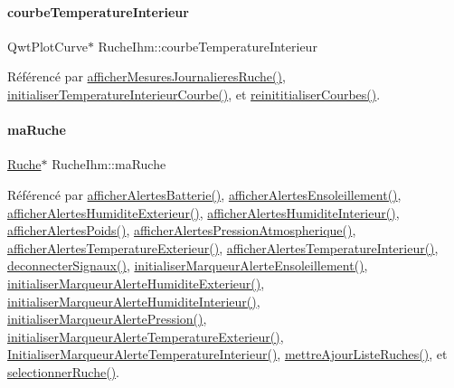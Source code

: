 \paragraph{\texorpdfstring{courbe\+Temperature\+Interieur}{courbeTemperatureInterieur}}
{\footnotesize\ttfamily Qwt\+Plot\+Curve$\ast$ Ruche\+Ihm\+::courbe\+Temperature\+Interieur\hspace{0.3cm}{\ttfamily [private]}}



Référencé par \hyperlink{class_ruche_ihm_a94bd98327a73a15aad1306fc31f53ce8}{afficher\+Mesures\+Journalieres\+Ruche()}, \hyperlink{class_ruche_ihm_ad7297b44f6431c0b0c42f1b11d78ace1}{initialiser\+Temperature\+Interieur\+Courbe()}, et \hyperlink{class_ruche_ihm_a098911c0edd701f7892e3d140ebffbd9}{reinititialiser\+Courbes()}.

\mbox{\label{class_ruche_ihm_a43a6b1fa31f4fba58d919daae3707b38}} 
\paragraph{\texorpdfstring{ma\+Ruche}{maRuche}}
{\footnotesize\ttfamily \hyperlink{class_ruche}{Ruche}$\ast$ Ruche\+Ihm\+::ma\+Ruche\hspace{0.3cm}{\ttfamily [private]}}



Référencé par \hyperlink{class_ruche_ihm_a5181062e21dc73908b660d97e9621fb6}{afficher\+Alertes\+Batterie()}, \hyperlink{class_ruche_ihm_aea5efc506f9825db2a4eb39a40d7eb18}{afficher\+Alertes\+Ensoleillement()}, \hyperlink{class_ruche_ihm_a76b73e39e55443fc7b9bb773eac3321f}{afficher\+Alertes\+Humidite\+Exterieur()}, \hyperlink{class_ruche_ihm_abfe91b271dde97048bb218b04c9e167b}{afficher\+Alertes\+Humidite\+Interieur()}, \hyperlink{class_ruche_ihm_a641d05346e527c3386ed9df6a7e6fafc}{afficher\+Alertes\+Poids()}, \hyperlink{class_ruche_ihm_abea08b19d4f52f6767a8618bbc25d956}{afficher\+Alertes\+Pression\+Atmospherique()}, \hyperlink{class_ruche_ihm_ada4be5a54f7fa57de6190d44e3cfcb82}{afficher\+Alertes\+Temperature\+Exterieur()}, \hyperlink{class_ruche_ihm_af4848134f2bc17d9772f2408a068e9d8}{afficher\+Alertes\+Temperature\+Interieur()}, \hyperlink{class_ruche_ihm_a348a76106f3072dd31a382c6025b8113}{deconnecter\+Signaux()}, \hyperlink{class_ruche_ihm_a6d52dd904573d1bfc9551421ab53e8cc}{initialiser\+Marqueur\+Alerte\+Ensoleillement()}, \hyperlink{class_ruche_ihm_ae572f3f2b76e8c9b14a699d3e29422ee}{initialiser\+Marqueur\+Alerte\+Humidite\+Exterieur()}, \hyperlink{class_ruche_ihm_a42785d6da8aca09d8becb6d500de8d9f}{initialiser\+Marqueur\+Alerte\+Humidite\+Interieur()}, \hyperlink{class_ruche_ihm_a87e4e8d783ea0f15d6304ed604c7ddaa}{initialiser\+Marqueur\+Alerte\+Pression()}, \hyperlink{class_ruche_ihm_a410bcf0b7ac3ea7134af65d479802c48}{initialiser\+Marqueur\+Alerte\+Temperature\+Exterieur()}, \hyperlink{class_ruche_ihm_a0f44cb030202047fa9a364dfcbf9a13f}{Initialiser\+Marqueur\+Alerte\+Temperature\+Interieur()}, \hyperlink{class_ruche_ihm_a77cb005fde7e2271e8721c23cef13b3e}{mettre\+Ajour\+Liste\+Ruches()}, et \hyperlink{class_ruche_ihm_a7324ae6ea574ccdad47783f466933157}{selectionner\+Ruche()}.

